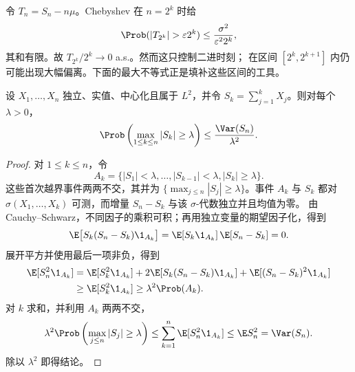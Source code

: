 \begin{example}[有限方差的二进尺度]\label{ex:5-4-2-3}
令 $T_n=S_n-n\mu$。Chebyshev 在 $n=2^k$ 时给
\[
 \Prob(|T_{2^k}|>\varepsilon2^k)
 \leq\frac{\sigma^2}{\varepsilon^2 2^k},
\]
其和有限。故 $T_{2^k}/2^k\to0$ a.s.。然而这只控制二进时刻；
在区间 $[2^k,2^{k+1}]$ 内仍可能出现大幅偏离。下面的最大不等式正是填补这些区间的工具。
\end{example}

\begin{theorem}\label{theorem:5-4-2-2}
设 $X_1,\dots,X_n$ 独立、实值、中心化且属于 $L^2$，并令
$S_k=\sum_{j=1}^kX_j$。则对每个 $\lambda>0$，
\[
 \Prob\left(\max_{1\leq k\leq n}|S_k|\geq\lambda\right)
 \leq\frac{\Var(S_n)}{\lambda^2}.
\]
\end{theorem}

\begin{proof}
对 $1\leq k\leq n$，令
\[
 A_k=\{|S_1|<\lambda,\dots,|S_{k-1}|<\lambda,
            |S_k|\geq\lambda\}.
\]
这些首次越界事件两两不交，其并为
$\{\max_{j\leq n}|S_j|\geq\lambda\}$。事件 $A_k$ 与 $S_k$ 都对
$\sigma(X_1,\dots,X_k)$ 可测，而增量 $S_n-S_k$ 与该 $\sigma$-代数独立并且均值为零。
由 Cauchy--Schwarz，不同因子的乘积可积；再用独立变量的期望因子化，得到
\[
 \E\bigl[S_k(S_n-S_k)\1_{A_k}\bigr]
 =\E[S_k\1_{A_k}]\,\E[S_n-S_k]=0.
\]
展开平方并使用最后一项非负，得到
\begin{align*}
 \E[S_n^2\1_{A_k}]
 &=\E[S_k^2\1_{A_k}]
   +2\E[S_k(S_n-S_k)\1_{A_k}]
   +\E[(S_n-S_k)^2\1_{A_k}]\\
 &\geq\E[S_k^2\1_{A_k}]
 \geq\lambda^2\Prob(A_k).
\end{align*}
对 $k$ 求和，并利用 $A_k$ 两两不交，
\[
 \lambda^2\Prob\left(\max_{j\leq n}|S_j|\geq\lambda\right)
 \leq\sum_{k=1}^n\E[S_n^2\1_{A_k}]
 \leq\E S_n^2=\Var(S_n).
\]
除以 $\lambda^2$ 即得结论。
\end{proof}

\begin{center}
\end{center}

